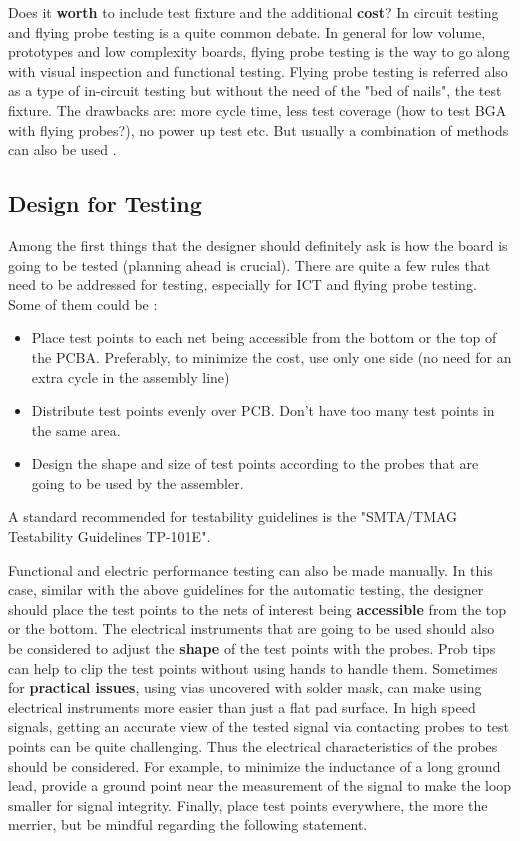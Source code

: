 \documentclass[final]{cubedoc}
\begin{document}
	Does it \textbf{worth} to include test fixture and the additional \textbf{cost}? In circuit testing and flying probe testing is a quite common debate. In general for low volume, prototypes and low complexity boards, flying probe testing is the way to go along with visual inspection and functional testing. Flying probe testing is referred also as a type of in-circuit testing but without the need of the "bed of nails", the test fixture. The drawbacks are: more cycle time, less test coverage (how to test BGA with flying probes?), no power up test etc. But usually a combination of methods can also be used \cite{matric:flying}. 
	
	\subsection{Design for Testing}
	
	
	Among the first things that the designer should definitely ask is how the board is going to be tested (planning ahead is crucial). There are quite a few rules that need to be addressed for testing, especially for ICT and flying probe testing. Some of them could be \cite{ema2019hitchhiker}:
	
	\begin{itemize}
		\item Place test points to each net being accessible from the bottom or the top of the PCBA. Preferably, to minimize the cost, use only one side (no need for an extra cycle in the assembly line) 
		
		
		\item Distribute test points evenly over PCB. Don't have too many test points in the same area. 
		\item Design the shape and size of test points according to the probes that are going to be used by the assembler.
	\end{itemize}
	
	A standard recommended for testability guidelines is the "SMTA/TMAG Testability Guidelines TP-101E".
	
	Functional and electric performance testing can also be made manually. In this case, similar with the above guidelines for the automatic testing, the designer should place the test points to the nets of interest being \textbf{accessible} from the top or the bottom. The electrical instruments that are going to be used should also be considered to adjust the \textbf{shape} of the test points with the probes. Prob tips can help to clip the test points without using hands to handle them. Sometimes for \textbf{practical issues}, using vias uncovered with solder mask, can make using electrical instruments more easier than just a flat pad surface. In high speed signals, getting an accurate view of the tested signal via contacting probes to test points can be quite challenging. Thus the electrical characteristics of the probes should be considered. For example, to minimize the inductance of a long ground lead, provide a ground point near the measurement of the signal to make the loop smaller for signal integrity. Finally, place test points everywhere, the more the merrier, but be mindful regarding the following statement. 
	
\end{document}
